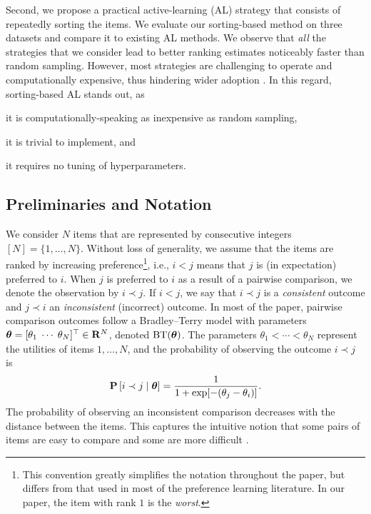 Second, we propose a practical active-learning (AL) strategy that consists of repeatedly sorting the items.
We evaluate our sorting-based method on three datasets and compare it to existing AL methods.
We observe that \emph{all} the strategies that we consider lead to better ranking estimates noticeably faster than random sampling.
However, most strategies are challenging to operate and computationally expensive, thus hindering wider adoption \citep{schein2007active}.
In this regard, sorting-based AL stands out, as
\begin{enuminline}
\item it is computationally-speaking as inexpensive as random sampling, 
\item it is trivial to implement, and
\item it requires no tuning of hyperparameters.
\end{enuminline}

\subsection{Preliminaries and Notation}

We consider $N$ items that are represented by consecutive integers $[N] = \{1, \ldots, N\}$.
Without loss of generality, we assume that the items are ranked by increasing preference\footnote{
This convention greatly simplifies the notation throughout the paper, but differs from that used in most of the preference learning literature.
In our paper, the item with rank $1$ is the \emph{worst}.}, i.e., $i < j$ means that $j$ is (in expectation) preferred to $i$.
When $j$ is preferred to $i$ as a result of a pairwise comparison, we denote the observation by $i \prec j$.
If $i < j$, we say that $i \prec j$ is a \emph{consistent} outcome and $j \prec i$ an \emph{inconsistent} (incorrect) outcome.
In most of the paper, pairwise comparison outcomes follow a Bradley--Terry model with parameters $\bm{\theta} = [\theta_1 \; \cdots \; \theta_N ]^\top \in \mathbf{R}^N$, denoted $\operatorname{BT}(\bm{\theta})$.
The parameters $\theta_1 < \cdots < \theta_N$ represent the utilities of items $1, \ldots, N$, and the probability of observing the outcome $i \prec j$ is
\begin{align*}
\mathbf{P}\left[ i \prec j \mid \bm{\theta} \right] = \frac{1}{1 + \exp[-(\theta_j - \theta_i)]}.
\end{align*}
The probability of observing an inconsistent comparison decreases with the distance between the items.
This captures the intuitive notion that some pairs of items are easy to compare and some are more difficult \citep{zermelo1928berechnung, bradley1952rank}.


